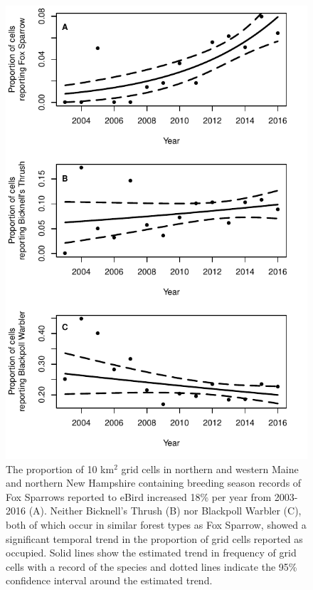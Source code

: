 \documentclass[fleqn,10pt,lineno]{wlpeerj} %
\begin{document}
\begin{figure}[ht]\centering
\includegraphics[width=\linewidth]{Figure3}
\caption{The proportion of 10 km$^{2}$ grid cells in northern and western Maine and northern New Hampshire containing breeding season records of Fox Sparrows reported to eBird increased 18\% per year from 2003-2016 (A). Neither Bicknell’s Thrush (B) nor Blackpoll Warbler (C), both of which occur in similar forest types as Fox Sparrow, showed a significant temporal trend in the proportion of grid cells reported as occupied. Solid lines show the estimated trend in frequency of grid cells with a record of the species and dotted lines indicate the 95\% confidence interval around the estimated trend.}
\label{fig:Figure3}
\end{figure}
\end{document}
